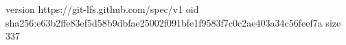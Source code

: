 version https://git-lfs.github.com/spec/v1
oid sha256:e63b2ffe83ef5d58b9dbfae25002f091bfe1f9583f7c0c2ae403a34c56feef7a
size 337

